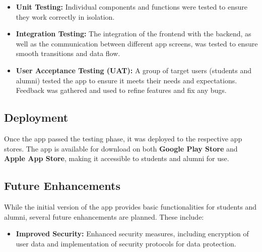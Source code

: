 \begin{itemize}
    \item \textbf{Unit Testing:} Individual components and functions were tested to ensure they work correctly in isolation.
    \item \textbf{Integration Testing:} The integration of the frontend with the backend, as well as the communication between different app screens, was tested to ensure smooth transitions and data flow.
    \item \textbf{User Acceptance Testing (UAT):} A group of target users (students and alumni) tested the app to ensure it meets their needs and expectations. Feedback was gathered and used to refine features and fix any bugs.
\end{itemize}

\subsection{Deployment}
Once the app passed the testing phase, it was deployed to the respective app stores. The app is available for download on both \textbf{Google Play Store} and \textbf{Apple App Store}, making it accessible to students and alumni for use.

\subsection{Future Enhancements}
While the initial version of the app provides basic functionalities for students and alumni, several future enhancements are planned. These include:

\begin{itemize}
    \item \textbf{Improved Security:} Enhanced security measures, including encryption of user data and implementation of security protocols for data protection.
\end{itemize}

